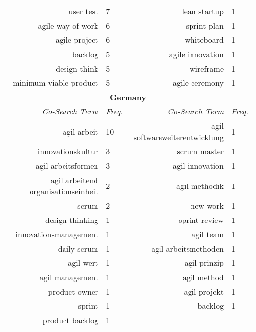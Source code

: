 \begin{spacing}{.65}
\begin{table}[!htbp]
{\begin{tabular}{rlrl}
user test              & 7  & lean startup                  & 1 \\
agile way of work      & 6  & sprint plan                   & 1 \\
agile project          & 6  & whiteboard                    & 1 \\
backlog                & 5  & agile innovation              & 1 \\
design think           & 5  & wireframe                     & 1 \\
minimum viable product & 5  & agile ceremony                & 1 \\




\multicolumn{4}{c}{\textbf{Germany}}                                                                   \\
\textit{Co-Search Term}             & \textit{Freq.} & \textit{Co-Search Term}        & \textit{Freq.} \\ \hline
agil arbeit                         & 10             & agil softwareweiterentwicklung & 1              \\
innovationskultur                   & 3              & scrum master                   & 1              \\
agil arbeitsformen                  & 3              & agil innovation                & 1              \\
agil arbeitend organisationseinheit & 2              & agil methodik                  & 1              \\
scrum                               & 2              & new work                       & 1              \\
design thinking                     & 1              & sprint review                  & 1              \\
innovationsmanagement               & 1              & agil team                      & 1              \\
daily scrum                         & 1              & agil arbeitsmethoden           & 1              \\
agil wert                           & 1              & agil prinzip                   & 1              \\
agil management                     & 1              & agil method                    & 1              \\
product owner                       & 1              & agil projekt                   & 1              \\
sprint                              & 1              & backlog                        & 1              \\
product backlog                     & 1              &                                &               
\end{tabular}%
}
\end{table}
\end{spacing}
\endgroup



